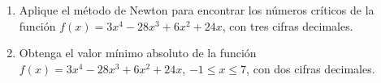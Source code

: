 \item 
\begin{enumerate}
        \item[(a)] Aplique el método de Newton para encontrar los números críticos de la función $f(x) = 3x^4 - 28x^3 + 6x^2 + 24x$, con tres cifras decimales.
        \item[(b)] Obtenga el valor mínimo absoluto de la función $f(x) = 3x^4 - 28x^3 + 6x^2 + 24x$, $-1 \le x \le 7$, con dos cifras decimales.
    \end{enumerate}
